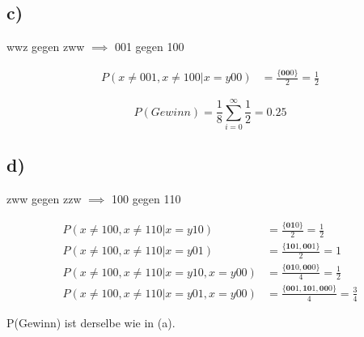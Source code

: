 \documentclass{article}
\begin{document}
\subsection*{c)}
wwz gegen zww $\implies$ 001 gegen 100


\begin{align*}
P(x \neq 001 , x \neq 100 | x = y00) &= \frac{ \{ \textbf{00}0 \} }{ 2 } = \frac{1}{2} 
\end{align*}

\[ P(Gewinn) =  \frac{1}{8}  \sum_{i=0}^{\infty} \frac{1}{2} = 0.25 \]

\subsection*{d)}
zww gegen zzw $\implies$ 100 gegen 110


\begin{align*}
P(x \neq 100 , x \neq 110 | x = y10) &= \frac{ \{ \textbf{01}0 \} }{ 2 } = \frac{1}{2} \\
P(x \neq 100 , x \neq 110 | x = y01) &= \frac{ \{ \textbf{10}1 , \textbf{00}1 \} }{ 2 } = 1\\
P(x \neq 100 , x \neq 110 | x = y10 , x = y00) &= \frac{ \{ \textbf{01}0 , \textbf{00}0 \} }{ 4 } = \frac{1}{2}\\
P(x \neq 100 , x \neq 110 | x = y01 , x = y00) &= \frac{ \{ \textbf{00}1 , \textbf{10}1 , \textbf{00}0 \} }{ 4 } = \frac{3}{4}
\end{align*}

P(Gewinn) ist derselbe wie in (a).
\end{document}
